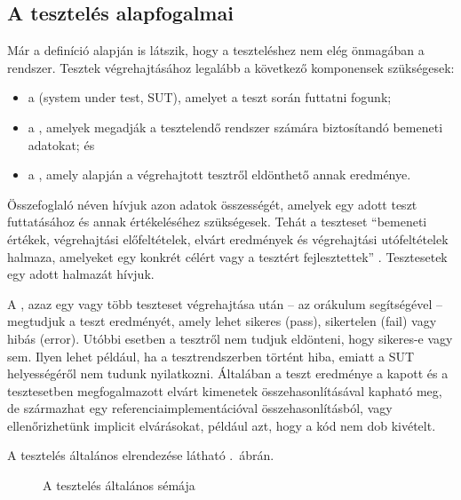 \subsection{A tesztelés alapfogalmai}
Már a definíció alapján is látszik, hogy a teszteléshez nem elég önmagában a rendszer. Tesztek végrehajtásához legalább a következő komponensek szükségesek: 
\begin{itemize}
\item a  (system under test, SUT), amelyet a teszt során futtatni fogunk;
\item a , amelyek megadják a tesztelendő rendszer számára biztosítandó bemeneti adatokat; és
\item a , amely alapján a végrehajtott tesztről eldönthető annak eredménye.
\end{itemize}

Összefoglaló néven  hívjuk azon adatok összességét, amelyek egy adott teszt futtatásához és annak értékeléséhez szükségesek. Tehát a teszteset ``bemeneti értékek, végrehajtási előfeltételek, elvárt eredmények és végrehajtási utófeltételek halmaza, amelyeket egy konkrét célért vagy a tesztért fejlesztettek'' \cite{HTB-glossary,IEEE-24765}. Tesztesetek egy adott halmazát  hívjuk.

A , azaz egy vagy több teszteset végrehajtása után \cite{IEEE-24765} -- az orákulum segítségével -- megtudjuk a teszt eredményét, amely lehet sikeres (pass), sikertelen (fail) vagy hibás (error). Utóbbi esetben a tesztről nem tudjuk eldönteni, hogy sikeres-e vagy sem. Ilyen lehet például, ha a tesztrendszerben történt hiba, emiatt a SUT helyességéről nem tudunk nyilatkozni. 
Általában a teszt eredménye a kapott és a tesztesetben megfogalmazott elvárt kimenetek összehasonlításával kapható meg, de származhat egy referenciaimplementációval összehasonlításból, vagy ellenőrizhetünk implicit elvárásokat, például azt, hogy a kód nem dob kivételt.

A tesztelés általános elrendezése látható .~ábrán.

\begin{figure}[h]
	\centering
	
	
	\caption{A tesztelés általános sémája}
	\label{fig:teszteles-elrendezes-orakulum}
\end{figure}

